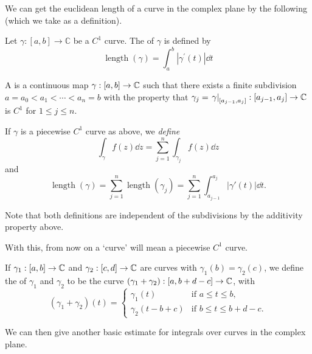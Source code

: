\documentclass[a4paper]{scrartcl}
\begin{document}
We can get the euclidean length of a curve in the complex plane by the following (which we take as a definition).

\begin{definition}
Let $\gamma:[a, b] \rightarrow \mathbb{C}$ be a $C^{1}$ curve. The  of $\gamma$ is defined by
$$
\operatorname{length}(\gamma)=\int_{a}^{b}\left|\gamma^{\prime}(t)\right| \dd t
$$
\end{definition}

\begin{definition}
    A  is a continuous map $\gamma: [a, b] \rightarrow \mathbb{C}$ such that there exists a finite subdivision
    $a = a_0 < a_1 < \cdots < a_n = b$ with the property that $\gamma_j = \left.\gamma\right|_{[a_{j - 1}, a_j]}: [a_{j - 1}, a_j] \rightarrow \mathbb{C}$ is $C^1$ for $1 \leq j \leq n$.
\end{definition}

If $\gamma$ is a piecewise $C^1$ curve as above, we \emph{define}
$$
\int_\gamma f(z) \dd z = \sum_{j = 1}^n \int_{\gamma_j} f(z) \dd z
$$
and
$$
\operatorname{length}(\gamma) = \sum_{j = 1}^{n} \operatorname{length}(\gamma_j) = \sum_{j = 1}^n \int_{a_{j - 1}}^{a_j} |\gamma'(t)| \dd t.
$$

\begin{remark}
    Note that both definitions are independent of the subdivisions by the additivity property above.
\end{remark}

With this, from now on a `curve' will mean a piecewise $C^1$ curve.

\begin{definition}
    If $\gamma_1: [a, b] \rightarrow \mathbb{C}$ and $\gamma_2 : [c, d] \rightarrow \mathbb{C}$ are curves with $\gamma_1(b) = \gamma_2(c)$, we define the  of $\gamma_1$ and $\gamma_2$ to be the curve $(\gamma_1 + \gamma_2): [a, b + d - c] \rightarrow \mathbb{C}$, with
    $$
    (\gamma_1 + \gamma_2)(t) = \begin{cases}
        \gamma_1(t) &\mbox{if } a \leq t \leq b, \\
        \gamma_2(t - b + c) &\mbox{if } b \leq t \leq b + d - c.
       \end{cases}
    $$
\end{definition}

We can then give another basic estimate for integrals over curves in the complex plane.
\end{document}
